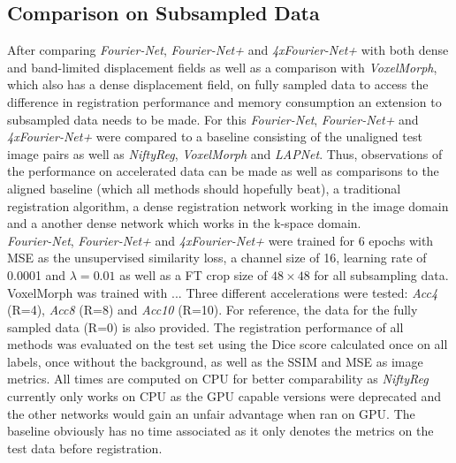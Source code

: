 \documentclass[english,version-2022-01]{uzl-thesis} %
\begin{document}
\subsection{Comparison on Subsampled Data} \label{SubSec:ComparisonSubsampling}
After comparing \emph{Fourier-Net}, \emph{Fourier-Net+} and \emph{4xFourier-Net+} with both dense and band-limited displacement fields as well as a comparison with \emph{VoxelMorph}, which also has a dense displacement field, on fully sampled data to access the difference in registration performance and memory consumption an extension to subsampled data needs to be made. For this \emph{Fourier-Net}, \emph{Fourier-Net+} and \emph{4xFourier-Net+} were compared to a baseline consisting of the unaligned test image pairs as well as \emph{NiftyReg}, \emph{VoxelMorph} and \emph{LAPNet}. Thus, observations of the performance on accelerated data can be made as well as comparisons to the aligned baseline (which all methods should hopefully beat), a traditional registration algorithm, a dense registration network working in the image domain and a another dense network which works in the k-space domain.\\
\emph{Fourier-Net}, \emph{Fourier-Net+} and \emph{4xFourier-Net+} were trained for 6 epochs with MSE as the unsupervised similarity loss, a channel size of 16, learning rate of 0.0001 and $\lambda=0.01$ as well as a FT crop size of $48 \times 48$ for all subsampling data. VoxelMorph was trained with ... Three different accelerations were tested: \textit{Acc4} (R=4), \textit{Acc8} (R=8) and \textit{Acc10} (R=10). For reference, the data for the fully sampled data (R=0) is also provided. The registration performance of all methods was evaluated on the test set using the Dice score calculated once on all labels, once without the background, as well as the SSIM and MSE as image metrics. All times are computed on CPU for better comparability as \emph{NiftyReg} currently only works on CPU as the GPU capable versions were deprecated and the other networks would gain an unfair advantage when ran on GPU. The baseline obviously has no time associated as it only denotes the metrics on the test data before registration.
\end{document}
